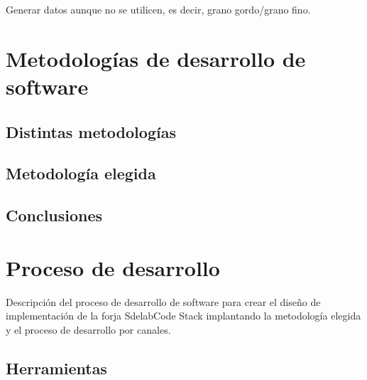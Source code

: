 \documentclass[a4paper, 12pt]{book}
\begin{document}
\par Generar datos aunque no se utilicen, es decir, grano gordo/grano fino.





\chapter{Metodolog\'ias de desarrollo de software}
\label{chap:metodologias}

\section{Distintas metodolog\'ias}
\label{sec:lista-metodologias}


\section{Metodolog\'ia elegida}
\label{sec:metodologia-elegida}


\section{Conclusiones}
\label{sec:metodologia-conclusiones}



\chapter{Proceso de desarrollo}
\label{chap:procesodesarrollo}

\par Descripci\'on del proceso de desarrollo de software para crear el dise\~no de implementaci\'on de la forja SdelabCode Stack implantando la metodolog\'ia elegida y el proceso de desarrollo por canales.

\section{Herramientas}
\label{sec:herramientas}
\end{document}
